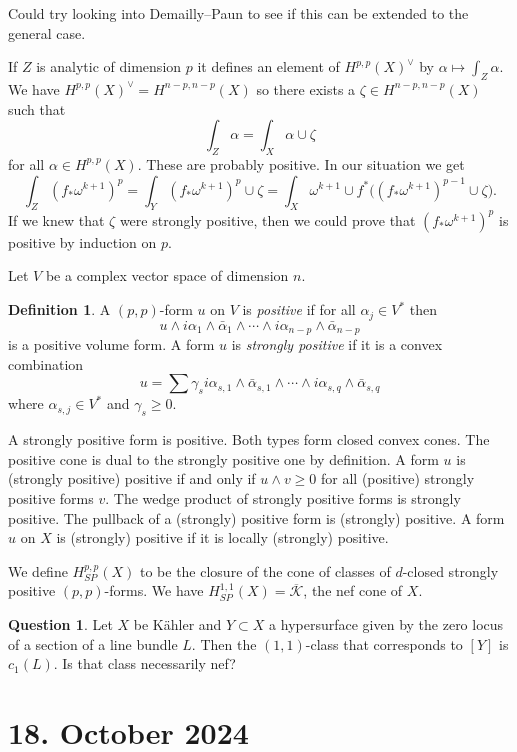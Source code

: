 \documentclass[11pt]{amsart}
\theoremstyle{definition}
\newtheorem{defi}[theo]{Definition}
\newtheorem{ques}[theo]{Question}
\def\ov#1{\overline{#1}}
\begin{document}
Could try looking into Demailly--Paun to see if this can be extended to the general case.

If $Z$ is analytic of dimension $p$ it defines an element of $H^{p,p}(X)^\vee$ by $\alpha \mapsto \int_Z \alpha$.
We have $H^{p,p}(X)^\vee = H^{n-p,n-p}(X)$ so there exists a $\zeta \in H^{n-p,n-p}(X)$ such that
\[
\int_Z \alpha = \int_X \alpha \cup \zeta
\]
for all $\alpha \in H^{p,p}(X)$.
These are probably positive.
In our situation we get
\[
\int_Z (f_*\omega^{k+1})^p
= \int_Y (f_*\omega^{k+1})^p \cup \zeta
= \int_X \omega^{k+1} \cup f^*\bigl( (f_*\omega^{k+1})^{p-1} \cup \zeta\bigr).
\]
If we knew that $\zeta$ were strongly positive, then we could prove that $(f_*\omega^{k+1})^p$ is positive by induction on $p$.

Let $V$ be a complex vector space of dimension $n$.

\begin{defi}
A $(p,p)$-form $u$ on $V$ is \emph{positive} if for all $\alpha_j \in V^*$ then
\[
u \wedge i \alpha_1 \wedge \bar \alpha_1 \wedge \cdots \wedge i \alpha_{n-p} \wedge \bar\alpha_{n-p}
\]
is a positive volume form.
A form $u$ is \emph{strongly positive} if it is a convex combination
\[
u = \sum \gamma_s 
i \alpha_{s,1} \wedge \bar \alpha_{s,1}
\wedge \cdots \wedge 
i \alpha_{s,q} \wedge \bar\alpha_{s,q}
\]
where $\alpha_{s,j} \in V^*$ and $\gamma_s \geq 0$.
\end{defi}

A strongly positive form is positive.
Both types form closed convex cones.
The positive cone is dual to the strongly positive one by definition.
A form $u$ is (strongly positive) positive if and only if $u \wedge v \geq 0$ for all (positive) strongly positive forms $v$.
The wedge product of strongly positive forms is strongly positive.
The pullback of a (strongly) positive form is (strongly) positive.
A form $u$ on $X$ is (strongly) positive if it is locally (strongly) positive.


We define $H^{p,p}_{SP}(X)$ to be the closure of the cone of classes of $d$-closed strongly positive $(p,p)$-forms.
We have $H^{1,1}_{SP}(X) = \ov{\mathcal K}$, the nef cone of $X$.


\begin{ques}
Let $X$ be K\"ahler and $Y \subset X$ a hypersurface given by the zero locus of a section of a line bundle $L$.
Then the $(1,1)$-class that corresponds to $[Y]$ is $c_1(L)$.
Is that class necessarily nef?
\end{ques}


\section{18. October 2024}
\end{document}
